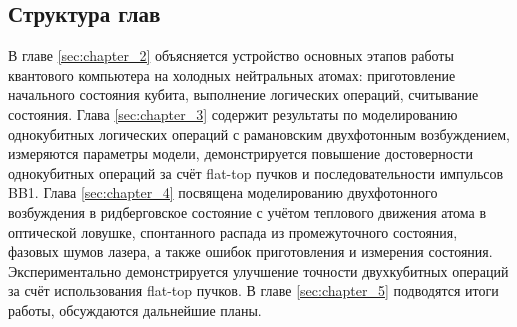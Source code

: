 \subsection{Структура глав} 

В главе \ref{sec:chapter_2} объясняется устройство основных этапов работы квантового компьютера на холодных нейтральных атомах: приготовление начального состояния кубита, выполнение логических операций, считывание состояния. Глава \ref{sec:chapter_3} содержит результаты по моделированию однокубитных логических операций с рамановским двухфотонным возбуждением, измеряются параметры модели, демонстрируется повышение достоверности однокубитных операций за счёт flat-top пучков и последовательности импульсов BB1. Глава \ref{sec:chapter_4} посвящена моделированию двухфотонного возбуждения в ридберговское состояние с учётом теплового движения атома в оптической ловушке, спонтанного распада из промежуточного состояния, фазовых шумов лазера, а также ошибок приготовления и измерения состояния. Экспериментально демонстрируется улучшение точности двухкубитных операций за счёт использования flat-top пучков. В главе \ref{sec:chapter_5} подводятся итоги работы, обсуждаются дальнейшие планы.

\newpage
